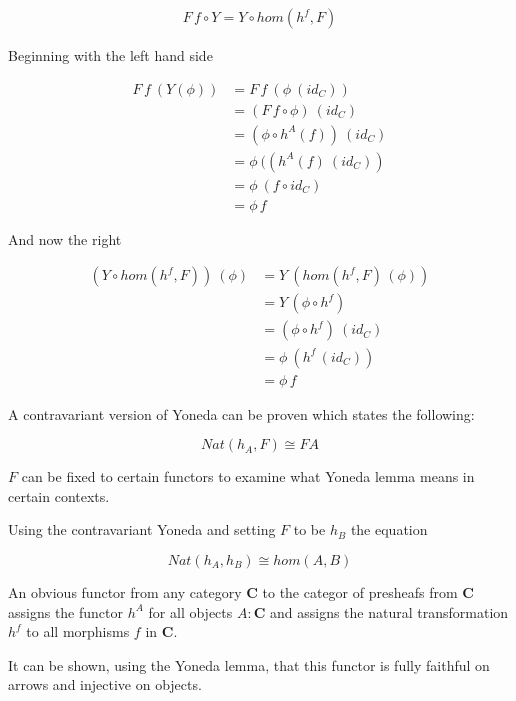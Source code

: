 \documentclass[a4paper,12pt]{article}
\begin{document}
\begin{align*}
    F \, f \circ Y = Y \circ hom(h^{f}, F)
\end{align*}

Beginning with the left hand side

\begin{align*}
    F \, f \ ( Y(\phi)) &= F \, f \ (\phi \ (id_{C})) \\
    &= (F \, f \circ \phi) \ (id_{C}) \\
    &= (\phi \circ h^{A}(f)) \ (id_{C}) \\
    &= \phi \ ((h^{A}(f) \ (id_{C})) \\
    &= \phi \ (f \circ id_{C}) \\
    &= \phi \, f
\end{align*}

And now the right

\begin{align*}
    (Y \circ hom(h^{f}, F)) \ (\phi) &= Y \ (hom(h^{f}, F) \, (\phi)) \\
    &= Y \, (\phi \circ h^{f}) \\
    &= (\phi \circ h^{f}) \ (id_{C}) \\
    &= \phi \ (h^{f} \, (id_{C})) \\ 
    &=  \phi \, f
\end{align*}

A contravariant version of Yoneda can be proven which states the following:

\begin{equation}
    Nat(h_{A}, F) \cong FA
    \label{coyoneda}
\end{equation}

$F$ can be fixed to certain functors to examine what Yoneda lemma means in
certain contexts.

Using the contravariant Yoneda and setting $F$ to be $h_{B}$ the equation

\begin{equation}
    Nat(h_{A}, h_{B}) \cong hom(A,B)
    \label{yonembedding}
\end{equation}


An obvious functor from any category \textbf{C} to the categor of presheafs from
\textbf{C} assigns the functor $h^{A}$ for all objects $A:\textbf{C}$ and
assigns the natural transformation $h^{f}$ to all morphisms $f$ in \textbf{C}.

It can be shown, using the Yoneda lemma, that this functor is fully faithful on
arrows and injective on objects.
\end{document}
